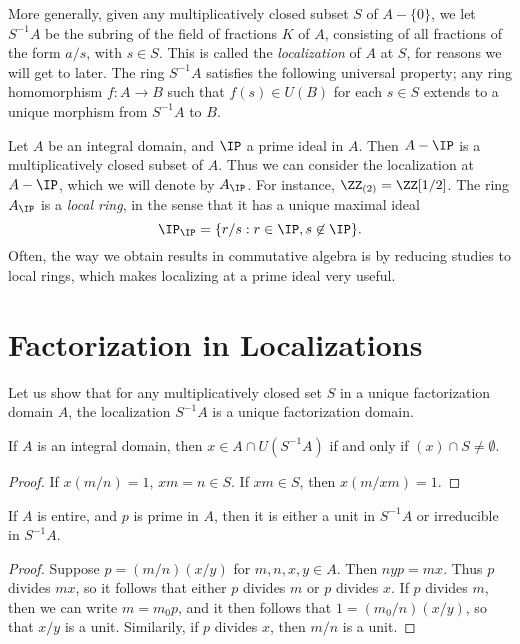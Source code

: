More generally, given any multiplicatively closed subset $S$ of $A - \{ 0 \}$, we let $S^{-1}A$ be the subring of the field of fractions $K$ of $A$, consisting of all fractions of the form $a/s$, with $s \in S$. This is called the \emph{localization} of $A$ at $S$, for reasons we will get to later. The ring $S^{-1}A$ satisfies the following universal property; any ring homomorphism $f: A \to B$ such that $f(s) \in U(B)$ for each $s \in S$ extends to a unique morphism from $S^{-1}A$ to $B$.

\begin{example}
    Let $A$ be an integral domain, and $\IP$ a prime ideal in $A$. Then $A - \IP$ is a multiplicatively closed subset of $A$. Thus we can consider the localization at $A - \IP$, which we will denote by $A_{\IP}$. For instance, $\ZZ_{(2)} = \ZZ[1/2]$. The ring  $A_{\IP}$ is a \emph{local ring}, in the sense that it has a unique maximal ideal
    \[ \IP_{\IP} = \{ r/s : r \in \IP, s \not \in \IP \}. \]
    Often, the way we obtain results in commutative algebra is by reducing studies to local rings, which makes localizing at a prime ideal  very useful.
\end{example}

\section{Factorization in Localizations}

Let us show that for any multiplicatively closed set $S$ in a unique factorization domain $A$, the localization $S^{-1}A$ is a unique factorization domain.

\begin{lemma}
    If $A$ is an integral domain, then $x \in A \cap U(S^{-1}A)$ if and only if $(x) \cap S \neq \emptyset$.
\end{lemma}
\begin{proof}
    If $x (m/n) = 1$, $xm = n \in S$. If $xm \in S$, then $x (m/xm) = 1$.
\end{proof}

\begin{lemma}
    If $A$ is entire, and $p$ is prime in $A$, then it is either a unit in $S^{-1}A$ or irreducible in $S^{-1}A$.
\end{lemma}
\begin{proof}
    Suppose $p = (m/n)(x/y)$ for $m,n,x,y \in A$. Then $nyp = mx$. Thus $p$ divides $mx$, so it follows that either $p$ divides $m$ or $p$ divides $x$. If $p$ divides $m$, then we can write $m = m_0p$, and it then follows that $1 = (m_0/n)(x/y)$, so that $x/y$ is a unit. Similarily, if $p$ divides $x$, then $m/n$ is a unit.
\end{proof}

